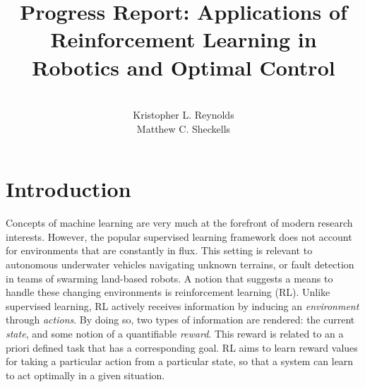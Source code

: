 \documentclass[10pt]{article}
\begin{document}
\title{Progress Report: Applications of Reinforcement Learning in Robotics and Optimal Control}%
\author{\\ %
Kristopher L. Reynolds\\
Matthew C. Sheckells
\\} %
\maketitle
\section{Introduction}
Concepts of machine learning are very much at the forefront of modern research interests. However, the popular supervised learning framework does not account for environments that are constantly in flux. This setting is relevant to autonomous underwater vehicles navigating unknown terrains, or fault detection in teams of swarming land-based robots. A notion that suggests a means to handle these changing environments is reinforcement learning (RL). Unlike supervised learning, RL actively receives information by inducing an \textit{environment} through \textit{actions}. By doing so, two types of information are rendered: the current \textit{state}, and some notion of a quantifiable \textit{reward}. This reward is related to an a priori defined task that has a corresponding goal. RL aims to learn reward values for taking a particular action from a particular state, so that a system can learn to act optimally in a given situation.
\end{document}
